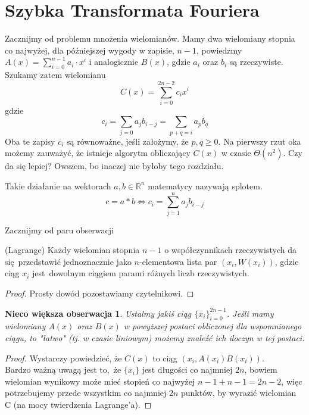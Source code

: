 \section{Szybka Transformata Fouriera}

\newtheorem{observation_small}{Malutka obserwacja}
\newtheorem{observation_bigger}{Nieco większa obserwacja}


\label{sec:fft}

Zacznijmy od problemu mnożenia wielomianów. Mamy dwa wielomiany stopnia co najwyżej, dla późniejszej wygody w zapisie, $n-1$, powiedzmy $A(x) = \sum_{i=0}^{n-1} a_i\cdot x^i$ i analogicznie $B(x)$, gdzie $a_i$ oraz $b_i$ są rzeczywiste.
Szukamy zatem wielomianu $$C(x) = \sum_{i=0}^{2n-2} c_ix^i$$ gdzie $$c_i = \sum_{j=0} a_jb_{i-j} = \sum_{p + q = i} a_pb_q $$ Oba te zapisy $c_i$ są równoważne, jeśli założymy, że $ p,q \geq 0$.
Na pierwszy rzut oka możemy zauważyć, że istnieje algorytm obliczający $C(x)$ w czasie $\Theta(n^2)$. Czy da się lepiej? Owszem, bo inaczej nie byłoby tego rozdziału.\\

\begin{definition}
Takie działanie na wektorach $a,b\in \mathbb{R}^n$ matematycy nazywają splotem.
$$c = a * b \Leftrightarrow c_i = \sum_{j=1}^{n}a_jb_{i-j}$$
\end{definition}

Zacznijmy od paru obserwacji
\begin{theorem} (Lagrange)
    Każdy wielomian stopnia $n-1$ o współczynnikach rzeczywistych da się przedstawić jednoznacznie jako $n$-elementowa lista par $(x_i, W(x_i))$, gdzie ciąg $x_i$ jest dowolnym ciągiem parami różnych liczb rzeczywistych.
\end{theorem}
\begin{proof}
    Prosty dowód pozostawiamy czytelnikowi.
\end{proof}

\begin{observation_bigger}
    Ustalmy jakiś ciąg $\{x_i\}_{i=0}^{2n-1}$.
    Jeśli mamy wielomiany $A(x)$ oraz $B(x)$ w powyższej postaci obliczonej dla wspomnianego ciągu, to "łatwo" (tj. w czasie liniowym) możemy znaleźć ich iloczyn w tej postaci.
\end{observation_bigger}
\begin{proof}
    Wystarczy powiedzieć, że $C(x)$ to ciąg $(x_i, A(x_i)B(x_i))$. \\
    Bardzo ważną uwagą jest to, że $\{x_i\}$ jest długości co najmniej $2n$, bowiem wielomian wynikowy może mieć stopień co najwyżej $n - 1 + n - 1 = 2n - 2$, więc potrzebujemy przede wszystkim co najmniej $2n$ punktów, by wyrazić wielomian C (na mocy twierdzenia Lagrange'a).
\end{proof}

